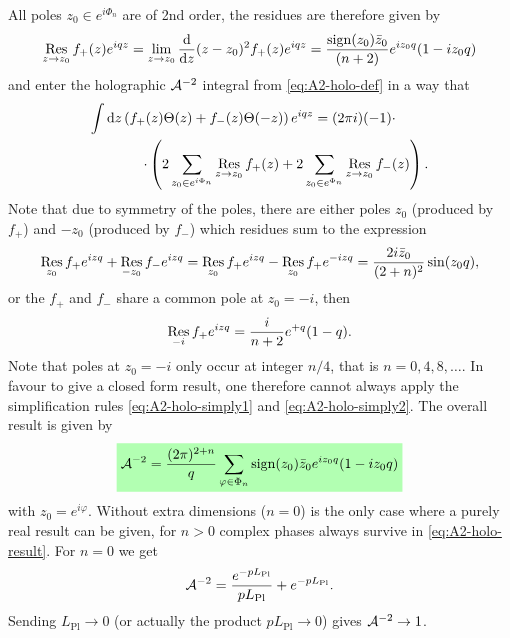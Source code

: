 \documentclass[12pt,a4paper]{report}
\numberwithin{equation}{chapter}
\newcommand{\highlight}[1]{%
  \colorbox{green!30}{$\displaystyle#1$}}
\begin{document}
All poles $z_0 \in e^{i\Phi_n}$ are of 2nd order, the residues are therefore given by
\begin{equation}
\res_{z \to z_0} f_+(z) e^{i q z} =
\lim_{z \to z_0} \dd{}z (z-z_0)^2 f_+(z) e^{iqz}
= \frac{\sign(z_0) \bar z_0}{(n+2)}
e^{i z_0 q}(1 - i z_0 q)
\end{equation}
and enter the holographic ${\cal A}^{-2}$ integral from \eqref{eq:A2-holo-def} in a way that
\begin{equation}
\begin{split}
\int \d z \left(f_+(z)\Theta(z) + f_-(z)\Theta(-z)\right) e^{iqz} =
(2\pi i) (-1) \cdot \quad\quad\ \\
\quad\quad\cdot \left(
2\sum_{z_0 \in e^{i\Phi_n}} \Res_{z\to z_0} f_+(z) + 
2\sum_{z_0 \in e^{\Phi_n}} \Res_{z\to z_0} f_-(z)
\right).
\end{split}
\end{equation}
Note that due to symmetry of the poles, there are either poles $z_0$ (produced by $f_+$)
and $-z_0$ (produced by $f_-$) which residues sum to the expression
\begin{equation} \label{eq:A2-holo-simply1}
\Res_{z_0} f_+ e^{izq} + \Res_{-z_0} f_- e^{izq} = 
\Res_{z_0} f_+ e^{izq} - \Res_{z_0} f_+ e^{-izq} = 
\frac{2i \bar z_0}{(2+n)^2} \sin(z_0 q),
\end{equation}
or the $f_+$ and $f_-$ share a common pole at $z_0=-i$, then
\begin{equation}\label{eq:A2-holo-simply2}
\Res_{-i} f_+ e^{izq} = \frac{i}{n+2} e^{+q}(1 - q).
\end{equation}
Note that poles at $z_0=-i$ only occur at integer $n/4$, that is $n=0,4,8,\dots$.
In favour to give a closed form result, one therefore cannot always apply the simplification
rules \eqref{eq:A2-holo-simply1} and \eqref{eq:A2-holo-simply2}.
The overall result is given by
\begin{equation}\label{eq:A2-holo-result}
\highlight{
\C A^{-2} =
\frac{(2\pi)^{2+n}}{q}
\sum_{\varphi \in \Phi_n} \sign(z_0) \bar z_0 e^{iz_0 q} (1 - iz_0 q)
}%
\end{equation}
with $z_0 = e^{i\varphi}$. Without extra dimensions ($n=0$) is the only case where a purely real result can
be given, for $n>0$ complex phases always survive in \eqref{eq:A2-holo-result}. For $n=0$ we get
\begin{equation}
{\cal A}^{-2} = \frac{e^{-pL_\text{Pl}}}{pL_\text{Pl}} + e^{-pL_\text{Pl}}.
\end{equation}
Sending $L_\text{Pl}\to 0$ (or actually the product $pL_\text{Pl}\to 0$) gives ${\cal A}^{-2} \to 1$.
%
\end{document}
